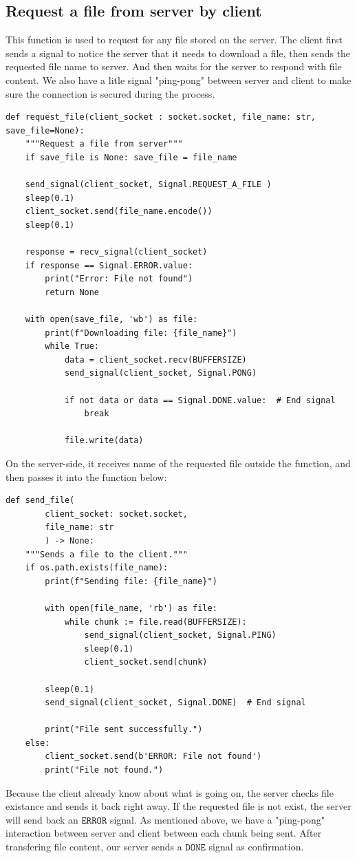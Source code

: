 \documentclass{article}
\begin{document}
\subsection*{Request a file from server by client}
This function is used to request for any file stored on the server. The client first sends a signal to notice the server that it needs to download a file, then
sends the requested file name to server. And then waits for the server to respond with file content. We also have a litle signal "ping-pong" between server and client
to make sure the connection is secured during the process.\pagebreak
\begin{lstlisting}[frame=single]
  def request_file(client_socket : socket.socket, file_name: str, save_file=None):
    """Request a file from server"""
    if save_file is None: save_file = file_name

    send_signal(client_socket, Signal.REQUEST_A_FILE )
    sleep(0.1)
    client_socket.send(file_name.encode())
    sleep(0.1)

    response = recv_signal(client_socket)
    if response == Signal.ERROR.value:
        print("Error: File not found")
        return None
     
    with open(save_file, 'wb') as file:
        print(f"Downloading file: {file_name}")
        while True:
            data = client_socket.recv(BUFFERSIZE)
            send_signal(client_socket, Signal.PONG)

            if not data or data == Signal.DONE.value:  # End signal
                break

            file.write(data)
\end{lstlisting}
On the server-side, it receives name of the requested file outside the function, and then passes it into the function below:
\begin{lstlisting}[frame=single]
  def send_file(
        client_socket: socket.socket, 
        file_name: str
        ) -> None:
    """Sends a file to the client."""
    if os.path.exists(file_name):
        print(f"Sending file: {file_name}")

        with open(file_name, 'rb') as file:
            while chunk := file.read(BUFFERSIZE):
                send_signal(client_socket, Signal.PING)
                sleep(0.1)
                client_socket.send(chunk)

        sleep(0.1)
        send_signal(client_socket, Signal.DONE)  # End signal

        print("File sent successfully.")
    else:
        client_socket.send(b'ERROR: File not found')
        print("File not found.")
\end{lstlisting}
Because the client already know about what is going on, the server checks file existance and sends it back right away. If the requested file is not exist,
the server will send back an $ \texttt{ERROR}$ signal. As mentioned above, we have a "ping-pong" interaction between server and client between each chunk 
being sent. After transfering file content, our server sends a $\texttt{DONE}$ signal as confirmation. 
\end{document}

